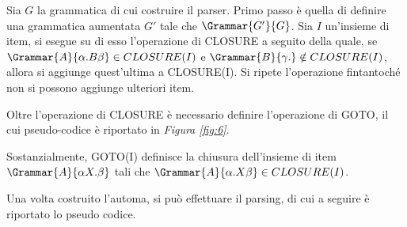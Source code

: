\documentclass{subfiles}
\begin{document}
Sia \(G\) la grammatica di cui costruire il parser.
Primo passo è quella di definire una grammatica aumentata \(G'\) tale che \(\Grammar{G'}{G}\).
Sia \(I\) un'insieme di item, si esegue su di esso l'operazione di CLOSURE a seguito della quale,
se \(\Grammar{A}{\alpha . B\beta} \in CLOSURE(I)\) e \(\Grammar{B}{\gamma .} \notin CLOSURE(I)\), allora si aggiunge quest'ultima a CLOSURE(I).
Si ripete l'operazione fintantoché non si possono aggiunge ulteriori item.

Oltre l'operazione di CLOSURE è necessario definire l'operazione di GOTO, il cui pseudo-codice è riportato in \emph{Figura \ref{fig:6}}.


\noindent Sostanzialmente, GOTO(I) definisce la chiusura dell'insieme di item \(\Grammar{A}{\alpha X.\beta}\) tali che \(\Grammar{A}{\alpha .X\beta} \in CLOSURE(I)\).

\noindent Una volta costruito l'automa, si può effettuare il parsing, di cui a seguire è riportato lo pseudo codice.

\end{document}
